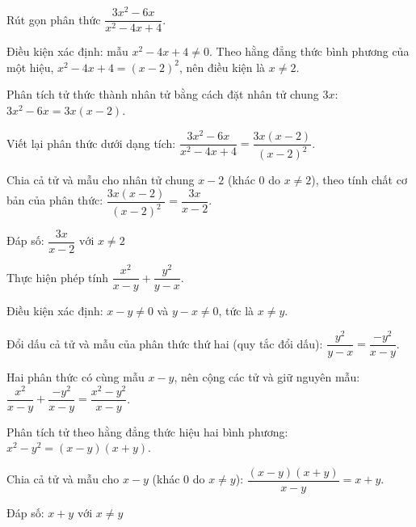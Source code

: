 \begin{problem}[8DS-PS-002]
Rút gọn phân thức $\dfrac{3x^2 - 6x}{x^2 - 4x + 4}$.

\begin{solution}
Điều kiện xác định: mẫu $x^2 - 4x + 4 \neq 0$. Theo hằng đẳng thức bình phương của một hiệu, $x^2 - 4x + 4 = (x - 2)^2$, nên điều kiện là $x \neq 2$.

Phân tích tử thức thành nhân tử bằng cách đặt nhân tử chung $3x$: $3x^2 - 6x = 3x(x - 2)$.

Viết lại phân thức dưới dạng tích: $\dfrac{3x^2 - 6x}{x^2 - 4x + 4} = \dfrac{3x(x - 2)}{(x - 2)^2}$.

Chia cả tử và mẫu cho nhân tử chung $x - 2$ (khác $0$ do $x \neq 2$), theo tính chất cơ bản của phân thức: $\dfrac{3x(x - 2)}{(x - 2)^2} = \dfrac{3x}{x - 2}$.

Đáp số: $\boxed{\dfrac{3x}{x - 2} \text{ với } x \neq 2}$
\end{solution}
\end{problem}

\begin{problem}[8DS-PS-003]
Thực hiện phép tính $\dfrac{x^2}{x - y} + \dfrac{y^2}{y - x}$.

\begin{solution}
Điều kiện xác định: $x - y \neq 0$ và $y - x \neq 0$, tức là $x \neq y$.

Đổi dấu cả tử và mẫu của phân thức thứ hai (quy tắc đổi dấu): $\dfrac{y^2}{y - x} = \dfrac{-y^2}{x - y}$.

Hai phân thức có cùng mẫu $x - y$, nên cộng các tử và giữ nguyên mẫu: $\dfrac{x^2}{x - y} + \dfrac{-y^2}{x - y} = \dfrac{x^2 - y^2}{x - y}$.

Phân tích tử theo hằng đẳng thức hiệu hai bình phương: $x^2 - y^2 = (x - y)(x + y)$.

Chia cả tử và mẫu cho $x - y$ (khác $0$ do $x \neq y$): $\dfrac{(x - y)(x + y)}{x - y} = x + y$.

Đáp số: $\boxed{x + y \text{ với } x \neq y}$
\end{solution}
\end{problem}

